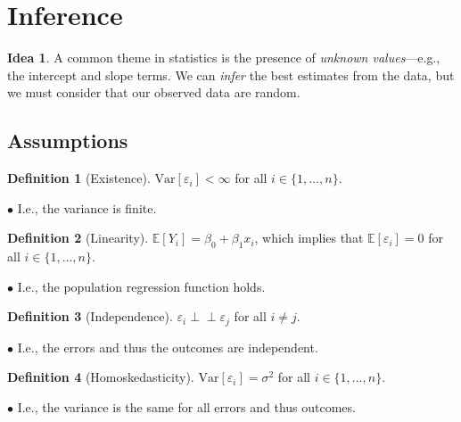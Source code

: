 \documentclass[12pt,oneside]{article}
\newcommand{\indep}{\perp\!\!\!\perp}
\newcommand{\E}{\mathbb{E}}
\newcommand{\Var}{\text{Var}}
\theoremstyle{definition}
\newtheorem{definition}{Definition}
\newtheorem{concept}{\faPen \ Concept Checker}
\newtheorem*{idea}{Idea}
\theoremstyle{remark}
\begin{document}
\section{Inference}

\begin{idea}
A common theme in statistics is the presence of \textit{unknown values}—e.g., the intercept and slope terms. We can \textit{infer} the best estimates from the data, but we must consider that our observed data are random.
\end{idea}

\subsection{Assumptions}

\begin{definition}[Existence]
$\Var[\varepsilon_i] < \infty$ for all $i \in \{1, \ldots, n\}$.

$\bullet$ I.e., the variance is finite.
\end{definition}



\begin{definition}[Linearity]
$\E[Y_i] = \beta_0 + \beta_1 x_i$, which implies that $\E[\varepsilon_i] = 0$ for all $i \in \{1, \ldots, n\}$.

$\bullet$ I.e., the population regression function holds.
\end{definition}

\begin{definition}[Independence]
$\varepsilon_i \indep \varepsilon_j$ for all $i \neq j$.

$\bullet$ I.e., the errors and thus the outcomes are independent.
\end{definition}

\begin{definition}[Homoskedasticity]
$\Var[\varepsilon_i] = \sigma^2$ for all $i \in \{1, \ldots, n\}$.

$\bullet$ I.e., the variance is the same for all errors and thus outcomes.
\end{definition}
\end{document}
